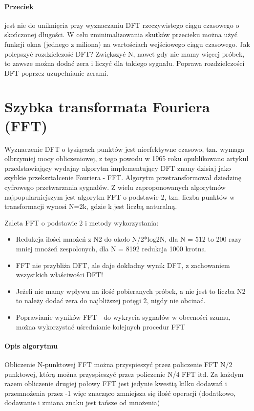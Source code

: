 \documentclass[a4paper,twoside]{report}
\begin{document}
\paragraph{Przeciek}
 jest nie do uniknięcia przy wyznaczaniu DFT rzeczywistego ciągu czasowego o skończonej długości.
W celu zminimalizowania skutków przecieku można użyć funkcji okna (jednego z miliona) na wartościach wejściowego ciągu czasowego.
Jak polepszyć rozdzielczość DFT? Zwiększyć N, nawet gdy nie mamy więcej próbek, to zawsze można dodać zera i liczyć dla takiego sygnału. 
Poprawa rozdzielczości DFT poprzez uzupełnianie zerami.

\section{Szybka transformata Fouriera (FFT)}
Wyznaczenie DFT o tysiącach punktów jest nieefektywne czasowo, tzn. wymaga olbrzymiej mocy obliczeniowej, z tego powodu w 1965 roku opublikowano artykuł przedstawiający wydajny algorytm implementujący DFT znany dzisiaj jako szybkie przekształcenie Fouriera  - FFT. Algorytm przetransformował dziedzinę cyfrowego przetwarzania sygnałów.
Z wielu zaproponowanych algorytmów najpopularniejszym jest algorytm FFT o podstawie 2, tzn. liczba punktów w transformacji wynosi N=2k, gdzie k jest liczbą naturalną.

Zaleta FFT o podstawie 2 i metody wykorzystania:
\begin{itemize}
	\item Redukcja ilości mnożeń z N2 do około N/2*log2N, dla N = 512 to 200 razy mniej mnożeń zespolonych, dla N = 8192 redukcja 1000 krotna. 
	\item FFT nie przybliża DFT, ale daje dokładny wynik DFT, z zachowaniem wszystkich właściwości DFT! 
	\item Jeżeli nie mamy wpływu na ilość pobieranych próbek, a nie jest to liczba N2 to należy dodać zera do najbliższej potęgi 2, nigdy nie obcinać.
	\item Poprawianie wyników FFT - do wykrycia sygnałów w obecności szumu, można wykorzystać uśrednianie kolejnych procedur FFT
\end{itemize}

\paragraph{Opis algorytmu}
Obliczenie N-punktowej FFT można przyspieszyć przez policzenie FFT N/2 punktowej, którą można przyspieszyć przez policzenie N/4 FFT itd. Za każdym razem obliczenie drugiej połowy FFT jest jedynie kwestią kilku dodawań i przemnożenia przez -1 więc znacząco zmniejsza się ilość operacji (dodatkowo, dodawanie i zmiana znaku jest tańsze od mnożenia)
\end{document}
